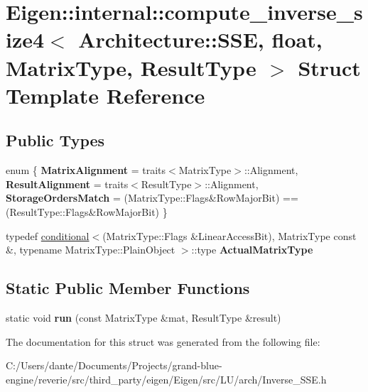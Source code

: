 \hypertarget{struct_eigen_1_1internal_1_1compute__inverse__size4_3_01_architecture_1_1_s_s_e_00_01float_00_011c9f0f9df97321dfc4664a6d9e4a8f31}{}\section{Eigen\+::internal\+::compute\+\_\+inverse\+\_\+size4$<$ Architecture\+::S\+SE, float, Matrix\+Type, Result\+Type $>$ Struct Template Reference}
\label{struct_eigen_1_1internal_1_1compute__inverse__size4_3_01_architecture_1_1_s_s_e_00_01float_00_011c9f0f9df97321dfc4664a6d9e4a8f31}
\subsection*{Public Types}
\begin{DoxyCompactItemize}
\item 
\mbox{\label{struct_eigen_1_1internal_1_1compute__inverse__size4_3_01_architecture_1_1_s_s_e_00_01float_00_011c9f0f9df97321dfc4664a6d9e4a8f31_adf3f1e9f736fc4c25f9783ffcbee92f9}} 
enum \{ {\bfseries Matrix\+Alignment} = traits$<$Matrix\+Type$>$\+::Alignment, 
{\bfseries Result\+Alignment} = traits$<$Result\+Type$>$\+::Alignment, 
{\bfseries Storage\+Orders\+Match} = (Matrix\+Type\+::Flags\&Row\+Major\+Bit) == (Result\+Type\+::Flags\&Row\+Major\+Bit)
 \}
\item 
\mbox{\label{struct_eigen_1_1internal_1_1compute__inverse__size4_3_01_architecture_1_1_s_s_e_00_01float_00_011c9f0f9df97321dfc4664a6d9e4a8f31_a3b9b2332c19ad1337922138ef2b4a011}} 
typedef \mbox{\hyperlink{struct_eigen_1_1internal_1_1conditional}{conditional}}$<$(Matrix\+Type\+::\+Flags \&Linear\+Access\+Bit), Matrix\+Type const \&, typename Matrix\+Type\+::\+Plain\+Object $>$\+::type {\bfseries Actual\+Matrix\+Type}
\end{DoxyCompactItemize}
\subsection*{Static Public Member Functions}
\begin{DoxyCompactItemize}
\item 
\mbox{\label{struct_eigen_1_1internal_1_1compute__inverse__size4_3_01_architecture_1_1_s_s_e_00_01float_00_011c9f0f9df97321dfc4664a6d9e4a8f31_affc709e9578304b42627aa8e238455a9}} 
static void {\bfseries run} (const Matrix\+Type \&mat, Result\+Type \&result)
\end{DoxyCompactItemize}


The documentation for this struct was generated from the following file\+:\begin{DoxyCompactItemize}
\item 
C\+:/\+Users/dante/\+Documents/\+Projects/grand-\/blue-\/engine/reverie/src/third\+\_\+party/eigen/\+Eigen/src/\+L\+U/arch/Inverse\+\_\+\+S\+S\+E.\+h\end{DoxyCompactItemize}
